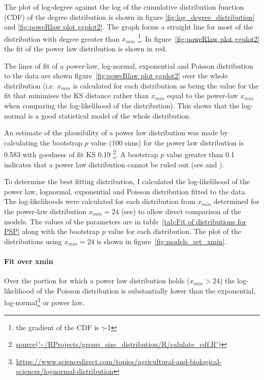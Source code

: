 The plot of log-degree against the log of the cumulative distribution function (CDF) of the degree distribution is shown in figure \ref{fig:log_degree_distribution} and  \ref{fig:poweRlaw plot ggplot2}. The graph forms a straight line for most of the distribution with degree greater than $x_{min}$
\footnote{the gradient of the CDF is $\gamma$-1}. In figure~\ref{fig:poweRlaw plot ggplot2} the fit of the power law distribution is shown in red. 

The lines of fit of a power-law, log-normal, exponential and Poisson distribution to the data are shown figure~\ref{fig:poweRlaw plot ggplot2} over the whole distribution (i.e. $x_{min}$ is calculated for each distribution as being the value for the fit that minimises the KS distance rather than $x_{min}$ equal to the power-law $x_{min}$ when comparing the log-likelihood of the distribution). This shows that the log-normal is a good statistical model of the whole distribution.

An estimate of the plausibility of a power law distribution was made by calculating the bootstrap $p$ value (100 sims) for the power law distribution is 0.583 with goodness of fit KS 0.19 \footnote{\url{source('~/RProjects/group_size_distribution/R/calulate_cdf.R')}}. A bootstrap $p$ value greater than 0.1 indicates that a power law distribution cannot be ruled out (see \cite{gillespie2015fitting} and \cite{clauset2009power}).



To determine the best fitting distribution, I calculated the log-likelihood of the power law, lognormal, exponential and Poisson distribution fitted to the data. The log-likelihoods were calculated for each distribution from $x_{min}$ determined for the power-law distribution $x_{min} = 24$ (see\cite{clauset2009power}) to allow direct comparison of the models. The values of the parameters are in table~\ref{tab:Fit of distributions for PSP} along with the bootstrap $p$ value for each distribution. The plot of the distributions using $x_{min}=24$ is shown in figure~\ref{fig:models_set_xmin}.


\paragraph{Fit over xmin}
Over the portion for which a power law distribution holds ($x_{min}>24$) the log-likelihood of the Poisson distribution is substantially lower than the exponential, log-normal\footnote{\url{https://www.sciencedirect.com/topics/agricultural-and-biological-sciences/lognormal-distribution}} or power law. 

